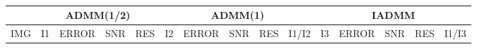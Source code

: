 \documentclass[a4paper]{article}
\begin{document}
\small
\tt
\begin{tabular}{|r|rrrr|rrrrr|rrrrr|}
  \cline{2-15}
  \multicolumn{1}{c|}{} & \multicolumn{4}{c|}{ADMM(1/2)}
      & \multicolumn{5}{c|}{ADMM(1)} & \multicolumn{5}{c|}{IADMM}\\
  \hline
  \rowcolor[gray]{0.9}
  IMG & I1 & ERROR & SNR & RES & I2 & ERROR & SNR & RES & I1/I2 & I3 & ERROR & SNR & RES & I1/I3 \\
  
  \hline
\end{tabular}
\end{document}

